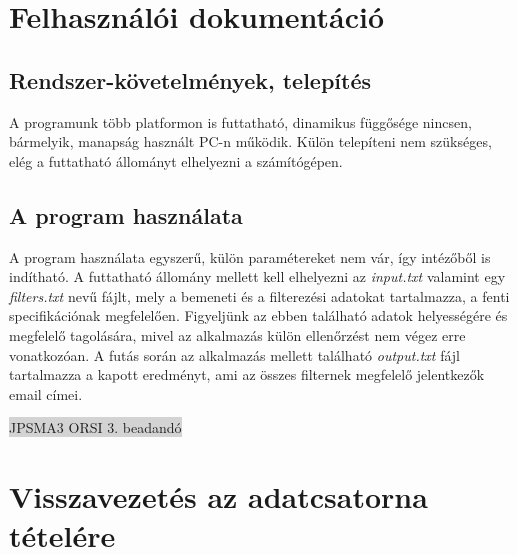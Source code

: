 \documentclass[12pt]{article}
\begin{document}
\section{Felhasználói dokumentáció}

\subsection{Rendszer-követelmények, telepítés}

A programunk több platformon is futtatható, dinamikus függősége nincsen, bármelyik, manapság
használt PC-n működik. Külön telepíteni nem szükséges, elég a futtatható állományt elhelyezni
a számítógépen.

\subsection{A program használata}

A program használata egyszerű, külön paramétereket nem vár, így intézőből is indítható. A
futtatható állomány mellett kell elhelyezni az \textit{input.txt} valamint egy 
\textit{filters.txt} nevű fájlt, mely a bemeneti és a filterezési
adatokat tartalmazza, a fenti specifikációnak megfelelően. Figyeljünk az ebben található
adatok helyességére és megfelelő tagolására, mivel az alkalmazás külön ellenőrzést nem végez
erre vonatkozóan. A futás során az alkalmazás mellett található \textit{output.txt} fájl
tartalmazza a kapott eredményt, ami az összes filternek megfelelő jelentkezők email címei.

\newpage
\thispagestyle{empty}
\begin{center}
	\colorbox{lightgray}{{\large JPSMA3} \hspace{4.3cm} {\large ORSI 3. beadandó} \hspace{5.7cm} \thepage}
\end{center}

\section{Visszavezetés az adatcsatorna tételére}
\end{document}
